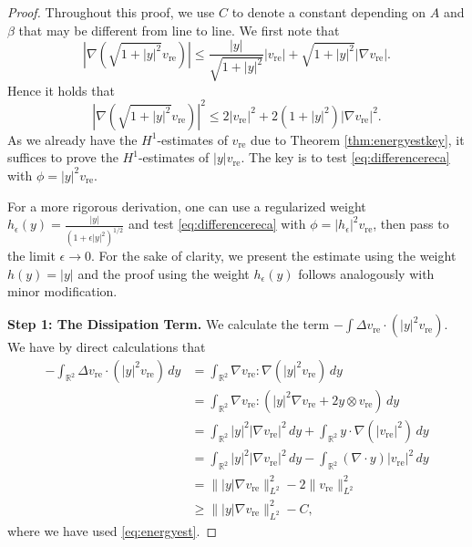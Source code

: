 \documentclass[12pt]{amsart}
\numberwithin{equation}{section}              %
\theoremstyle{remark}
\begin{document}
		\begin{proof}
        Throughout this proof, we use $C$ to denote a constant depending on $A$ and $\beta$ that may be different from line to line.
			We first note that
			\begin{equation*}
				|\nabla ( \sqrt{1+|y|^2} v_{\text{re}}) |\leq \frac{|y|}{\sqrt{1+|y|^2}} |v_{\text{re}}| + \sqrt{1+|y|^2} |\nabla v_{\text{re}}|.
			\end{equation*}
			Hence it holds that
			\begin{equation*}
				|\nabla ( \sqrt{1+|y|^2} v_{\text{re}}) |^2 \leq 2|v_{\text{re}}|^2 +  2(1+|y|^2)|\nabla v_{\text{re}}|^2.
			\end{equation*}
			As we  already have the $H^1$-estimates of $v_{\text{re}}$ due to Theorem \ref{thm:energyestkey}, it suffices to prove the $H^1$-estimates of $|y|v_{\text{re}}$. The key is to  test \eqref{eq:differencereca} with $\phi = |y|^2 v_{\text{re}}$.
			
			For a more rigorous derivation, one can use a regularized weight $h_\epsilon(y) = \frac{|y|}{(1+\epsilon|y|^2)^{1/2}}$ and 
			test \eqref{eq:differencereca} with $\phi = |h_\epsilon|^2 v_{\text{re}}$, then
			pass to the limit $\epsilon \to 0$. For the sake of clarity, we present the estimate using the weight $h(y) = |y|$ and the proof using the weight $h_\epsilon(y)$ follows analogously with minor modification. 
			
			\textbf{Step 1: The Dissipation Term.}
			We calculate the term $-\int \Delta v_{\text{re}} \cdot (|y|^2 v_{\text{re}})$. We have by direct calculations that
			\begin{align*}
				-\int_{\mathbb{R}^2} \Delta v_{\text{re}} \cdot (|y|^2 v_{\text{re}}) \, dy 
				&= \int_{\mathbb{R}^2} \nabla v_{\text{re}} : \nabla(|y|^2 v_{\text{re}}) \, dy \\
				&= \int_{\mathbb{R}^2} \nabla v_{\text{re}} : (|y|^2 \nabla v_{\text{re}} + 2y \otimes v_{\text{re}}) \, dy \\
				&= \int_{\mathbb{R}^2} |y|^2 |\nabla v_{\text{re}}|^2 \, dy + \int_{\mathbb{R}^2} y \cdot \nabla(|v_{\text{re}}|^2) \, dy \\
				&= \int_{\mathbb{R}^2} |y|^2 |\nabla v_{\text{re}}|^2 \, dy - \int_{\mathbb{R}^2} (\nabla \cdot y) |v_{\text{re}}|^2 \, dy \\
				&= \| |y| \nabla v_{\text{re}} \|_{L^2}^2 - 2 \|v_{\text{re}}\|_{L^2}^2\\
                &\geq \| |y| \nabla v_{\text{re}} \|_{L^2}^2-C,
			\end{align*}
            where we have used \eqref{eq:energyest}.
			

\end{proof}
\end{document}

